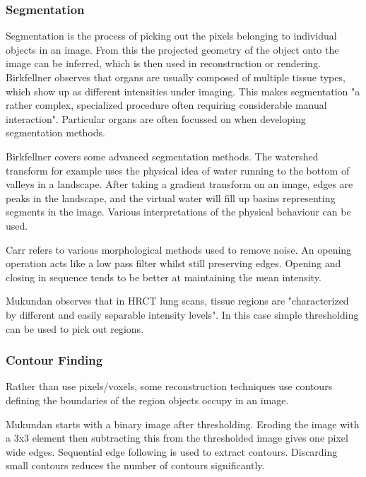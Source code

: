 \documentclass[11p, titlepage]{article}
\begin{document}
\subsubsection{Segmentation}

Segmentation is the process of picking out the pixels belonging to individual objects in an image. From this the projected geometry of the object onto the image can be inferred, which is then used in reconstruction or rendering. Birkfellner \cite{birkfellner2016applied} observes that organs are usually composed of multiple tissue types, which show up as different intensities under imaging. This makes segmentation "a rather complex, specialized procedure often requiring considerable manual interaction". Particular organs are often focussed on when developing segmentation methods.

Birkfellner \cite{birkfellner2016applied} covers some advanced segmentation methods. The watershed transform for example uses the physical idea of water running to the bottom of valleys in a landscape. After taking a gradient transform on an image, edges are peaks in the landscape, and the virtual water will fill up basins representing segments in the image. Various interpretations of the physical behaviour can be used.

Carr \cite{carr1996surface} refers to various morphological methods used to remove noise. An opening operation acts like a low pass filter whilst still preserving edges. Opening and closing in sequence tends to be better at maintaining the mean intensity.

Mukundan \cite{mukundan2016reconstruction} observes that in HRCT lung scans, tissue regions are "characterized by different and easily separable intensity levels". In this case simple thresholding can be used to pick out regions. 

\subsubsection{Contour Finding}

Rather than use pixels/voxels, some reconstruction techniques use contours defining the boundaries of the region objects occupy in an image. 

Mukundan \cite{mukundan2016reconstruction} starts with a binary image after thresholding. Eroding the image with a 3x3 element then subtracting this from the thresholded image gives one pixel wide edges. Sequential edge following is used to extract contours. Discarding small contours reduces the number of contours significantly.
\end{document}
